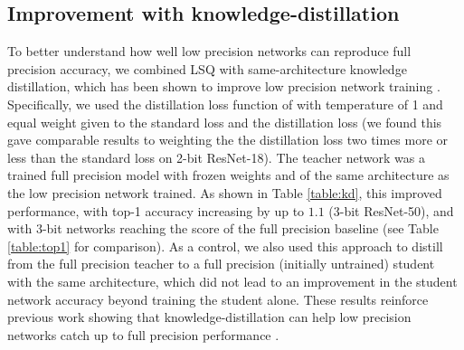 \documentclass{article}
\begin{document}
\subsection{Improvement with knowledge-distillation}

To better understand how well low precision networks can reproduce full precision accuracy, we combined LSQ with same-architecture knowledge distillation, which has been shown to improve low precision network training \citep{mishra2017apprentice}.
%
Specifically, we used the distillation loss function of \citet{hinton2015distilling} with temperature of 1 and equal weight given to the standard loss and the distillation loss (we found this gave comparable results to weighting the the distillation loss two times more or less than the standard loss on 2-bit ResNet-18).  The teacher network was a trained full precision model with frozen weights and of the same architecture as the low precision network trained.
%
As shown in Table \ref{table:kd}, this improved performance, with top-1 accuracy increasing by up to $1.1$ (3-bit ResNet-50), and with 3-bit networks reaching the score of the full precision baseline (see Table \ref{table:top1} for comparison).
%
As a control, we also used this approach to distill from the full precision teacher to a full precision (initially untrained) student with the same architecture, which did not lead to an improvement in the student network accuracy beyond training the student alone.
%
These results reinforce previous work showing that knowledge-distillation can help low precision networks catch up to full precision performance \citep{mishra2017apprentice}.
\end{document}
